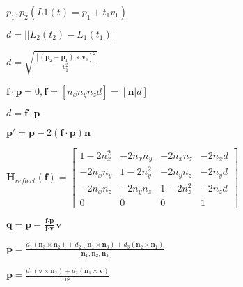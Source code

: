 \documentclass{article}
\def\lthtmlcheckvsize{\ifdim\ht\sizebox<\vsize 
  \ifdim\wd\sizebox<\hsize\expandafter\hfill\fi \expandafter\vfill
  \else\expandafter\vss\fi}%
\begin{document}
{\newpage\clearpage
{}%
$ p_1, p_2 (L1(t) = p_1 + t_1 v_1)$%
\lthtmlindisplaymathZ
\lthtmlcheckvsize\clearpage}

{\newpage\clearpage
{}%
$ d = ||L_2(t_2) - L_1(t_1)|| $%
\lthtmlindisplaymathZ
\lthtmlcheckvsize\clearpage}

{\newpage\clearpage
{}%
$ d = \sqrt{\frac{[(\textbf{p}_2 - \textbf{p}_1) \times \textbf{v}_1]^2}{v_1^2}}$%
\lthtmlindisplaymathZ
\lthtmlcheckvsize\clearpage}

{\newpage\clearpage
{}%
$ \textbf{f} \cdot \textbf{p} = 0, \textbf{f} = [n_x n_y n_z d] = 
[\textbf{n}|d] $%
\lthtmlindisplaymathZ
\lthtmlcheckvsize\clearpage}

{\newpage\clearpage
{}%
$ d = \textbf{f} \cdot \textbf{p}$%
\lthtmlindisplaymathZ
\lthtmlcheckvsize\clearpage}

{\newpage\clearpage
{}%
$ \textbf{p}' = \textbf{p} - 2(\textbf{f} \cdot \textbf{p}) \textbf{n} $%
\lthtmlindisplaymathZ
\lthtmlcheckvsize\clearpage}

{\newpage\clearpage
{}%
$ \textbf{H}_{reflect}(\textbf{f}) = \begin{bmatrix}
1 - 2n_x^2 & -2n_xn_y & -2n_xn_z & -2n_xd \\
-2n_xn_y & 1 - 2n_y^2 & -2n_yn_z & -2n_yd \\
-2n_xn_z & -2n_yn_z & 1 - 2n_z^2 & -2n_zd \\
0 & 0 & 0 & 1 
\end{bmatrix}
$%
\lthtmlindisplaymathZ
\lthtmlcheckvsize\clearpage}

{\newpage\clearpage
{}%
$ \textbf{q} = \textbf{p} - \frac{\textbf{f} \cdot \textbf{p}}{\textbf{f} \cdot \textbf{v}} \textbf{v}$%
\lthtmlindisplaymathZ
\lthtmlcheckvsize\clearpage}

{\newpage\clearpage
{}%
$ \textbf{p} = \frac{d_1(\textbf{n}_3 \times \textbf{n}_2) + d_2(\textbf{n}_1 \times \textbf{n}_3) + d_3(\textbf{n}_2 \times \textbf{n}_1)}
{[\textbf{n}_1, \textbf{n}_2, \textbf{n}_3]}$%
\lthtmlindisplaymathZ
\lthtmlcheckvsize\clearpage}

{\newpage\clearpage
{}%
$ \textbf{p} = \frac{d_1(\textbf{v} \times \textbf{n}_2) + d_2(\textbf{n}_1 \times \textbf{v})}
{v^2} $%
\lthtmlindisplaymathZ
\lthtmlcheckvsize\clearpage}
\end{document}
